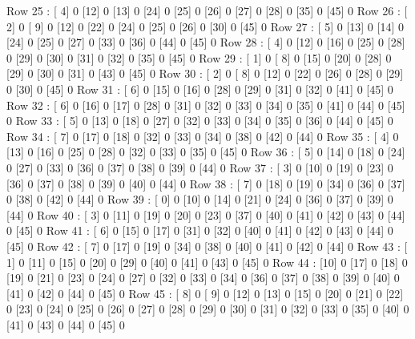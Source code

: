 Row 25 : [ 4]     0  [12]     0  [13]     0  [24]     0  [25]     0  [26]     0  [27]     0  [28]     0  [35]     0  [45]     0  
Row 26 : [ 2]     0  [ 9]     0  [12]     0  [22]     0  [24]     0  [25]     0  [26]     0  [30]     0  [45]     0  
Row 27 : [ 5]     0  [13]     0  [14]     0  [24]     0  [25]     0  [27]     0  [33]     0  [36]     0  [44]     0  [45]     0  
Row 28 : [ 4]     0  [12]     0  [16]     0  [25]     0  [28]     0  [29]     0  [30]     0  [31]     0  [32]     0  [35]     0  [45]     0  
Row 29 : [ 1]     0  [ 8]     0  [15]     0  [20]     0  [28]     0  [29]     0  [30]     0  [31]     0  [43]     0  [45]     0  
Row 30 : [ 2]     0  [ 8]     0  [12]     0  [22]     0  [26]     0  [28]     0  [29]     0  [30]     0  [45]     0  
Row 31 : [ 6]     0  [15]     0  [16]     0  [28]     0  [29]     0  [31]     0  [32]     0  [41]     0  [45]     0  
Row 32 : [ 6]     0  [16]     0  [17]     0  [28]     0  [31]     0  [32]     0  [33]     0  [34]     0  [35]     0  [41]     0  [44]     0  [45]     0  
Row 33 : [ 5]     0  [13]     0  [18]     0  [27]     0  [32]     0  [33]     0  [34]     0  [35]     0  [36]     0  [44]     0  [45]     0  
Row 34 : [ 7]     0  [17]     0  [18]     0  [32]     0  [33]     0  [34]     0  [38]     0  [42]     0  [44]     0  
Row 35 : [ 4]     0  [13]     0  [16]     0  [25]     0  [28]     0  [32]     0  [33]     0  [35]     0  [45]     0  
Row 36 : [ 5]     0  [14]     0  [18]     0  [24]     0  [27]     0  [33]     0  [36]     0  [37]     0  [38]     0  [39]     0  [44]     0  
Row 37 : [ 3]     0  [10]     0  [19]     0  [23]     0  [36]     0  [37]     0  [38]     0  [39]     0  [40]     0  [44]     0  
Row 38 : [ 7]     0  [18]     0  [19]     0  [34]     0  [36]     0  [37]     0  [38]     0  [42]     0  [44]     0  
Row 39 : [ 0]     0  [10]     0  [14]     0  [21]     0  [24]     0  [36]     0  [37]     0  [39]     0  [44]     0  
Row 40 : [ 3]     0  [11]     0  [19]     0  [20]     0  [23]     0  [37]     0  [40]     0  [41]     0  [42]     0  [43]     0  [44]     0  [45]     0  
Row 41 : [ 6]     0  [15]     0  [17]     0  [31]     0  [32]     0  [40]     0  [41]     0  [42]     0  [43]     0  [44]     0  [45]     0  
Row 42 : [ 7]     0  [17]     0  [19]     0  [34]     0  [38]     0  [40]     0  [41]     0  [42]     0  [44]     0  
Row 43 : [ 1]     0  [11]     0  [15]     0  [20]     0  [29]     0  [40]     0  [41]     0  [43]     0  [45]     0  
Row 44 : [10]     0  [17]     0  [18]     0  [19]     0  [21]     0  [23]     0  [24]     0  [27]     0  [32]     0  [33]     0  [34]     0  [36]     0  [37]     0  [38]     0  [39]     0  [40]     0  [41]     0  [42]     0  [44]     0  [45]     0  
Row 45 : [ 8]     0  [ 9]     0  [12]     0  [13]     0  [15]     0  [20]     0  [21]     0  [22]     0  [23]     0  [24]     0  [25]     0  [26]     0  [27]     0  [28]     0  [29]     0  [30]     0  [31]     0  [32]     0  [33]     0  [35]     0  [40]     0  [41]     0  [43]     0  [44]     0  [45]     0  

